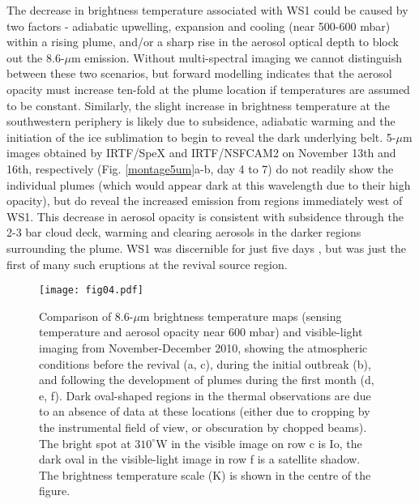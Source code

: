 \documentclass[final,authoryear,5p,times,twocolumn]{elsarticle}
\begin{document}
The decrease in brightness temperature associated with WS1 could be caused by two factors - adiabatic upwelling, expansion and cooling (near 500-600 mbar) within a rising plume, and/or a sharp rise in the aerosol optical depth to block out the 8.6-$\mu$m emission.  Without multi-spectral imaging we cannot distinguish between these two scenarios, but forward modelling indicates that the aerosol opacity must increase ten-fold at the plume location if temperatures are assumed to be constant.  Similarly, the slight increase in brightness temperature at the southwestern periphery is likely due to subsidence, adiabatic warming and the initiation of the ice sublimation to begin to reveal the dark underlying belt.  5-$\mu$m images obtained by IRTF/SpeX and IRTF/NSFCAM2 on November 13th and 16th, respectively (Fig. \ref{montage5um}a-b, day 4 to 7) do not readily show the individual plumes (which would appear dark at this wavelength due to their high opacity), but do reveal the increased emission from regions immediately west of WS1.  This decrease in aerosol opacity is consistent with subsidence through the 2-3 bar cloud deck, warming and clearing aerosols in the darker regions surrounding the plume.  WS1 was discernible for just five days \citep[the darker lane could be seen for eight,][]{11rogers_21, 16rogers}, but was just the first of many such eruptions at the revival source region.

\begin{figure*}
\begin{centering}
\centerline{\texttt{[image: fig04.pdf]}}
\caption{Comparison of 8.6-$\mu$m brightness temperature maps (sensing temperature and aerosol opacity near 600 mbar) and visible-light imaging from November-December 2010, showing the atmospheric conditions before the revival (a, c), during the initial outbreak (b), and following the development of plumes during the first month (d, e, f).  Dark oval-shaped regions in the thermal observations are due to an absence of data at these locations (either due to cropping by the instrumental field of view, or obscuration by chopped beams). The bright spot at $310^\circ$W in the visible image on row c is Io, the dark oval in the visible-light image in row f is a satellite shadow. The brightness temperature scale (K) is shown in the centre of the figure. }
\label{montage2010}
\end{centering}
\end{figure*}

\end{document}
